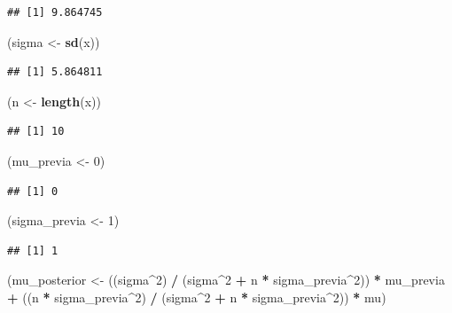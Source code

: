 \documentclass[
  12pt,
]{book}
\newenvironment{Shaded}{\begin{snugshade}}{\end{snugshade}}
\newcommand{\DecValTok}[1]{\textcolor[rgb]{0.00,0.00,0.81}{#1}}
\newcommand{\KeywordTok}[1]{\textcolor[rgb]{0.13,0.29,0.53}{\textbf{#1}}}
\newcommand{\NormalTok}[1]{#1}
\newcommand{\OperatorTok}[1]{\textcolor[rgb]{0.81,0.36,0.00}{\textbf{#1}}}
\newcommand{\StringTok}[1]{\textcolor[rgb]{0.31,0.60,0.02}{#1}}
\begin{document}
\begin{verbatim}
## [1] 9.864745
\end{verbatim}

\begin{Shaded}
\begin{Highlighting}[]
\NormalTok{(sigma \textless{}{-}}\StringTok{ }\KeywordTok{sd}\NormalTok{(x))}
\end{Highlighting}
\end{Shaded}

\begin{verbatim}
## [1] 5.864811
\end{verbatim}

\begin{Shaded}
\begin{Highlighting}[]
\NormalTok{(n \textless{}{-}}\StringTok{ }\KeywordTok{length}\NormalTok{(x))}
\end{Highlighting}
\end{Shaded}

\begin{verbatim}
## [1] 10
\end{verbatim}

\begin{Shaded}
\begin{Highlighting}[]
\NormalTok{(mu\_previa \textless{}{-}}\StringTok{ }\DecValTok{0}\NormalTok{)}
\end{Highlighting}
\end{Shaded}

\begin{verbatim}
## [1] 0
\end{verbatim}

\begin{Shaded}
\begin{Highlighting}[]
\NormalTok{(sigma\_previa \textless{}{-}}\StringTok{ }\DecValTok{1}\NormalTok{)}
\end{Highlighting}
\end{Shaded}

\begin{verbatim}
## [1] 1
\end{verbatim}

\begin{Shaded}
\begin{Highlighting}[]
\NormalTok{(mu\_posterior \textless{}{-}}\StringTok{ }\NormalTok{((sigma}\OperatorTok{\^{}}\DecValTok{2}\NormalTok{) }\OperatorTok{/}\StringTok{ }\NormalTok{(sigma}\OperatorTok{\^{}}\DecValTok{2} \OperatorTok{+}\StringTok{ }\NormalTok{n }\OperatorTok{*}\StringTok{ }\NormalTok{sigma\_previa}\OperatorTok{\^{}}\DecValTok{2}\NormalTok{)) }\OperatorTok{*}\StringTok{ }\NormalTok{mu\_previa }\OperatorTok{+}\StringTok{ }\NormalTok{((n }\OperatorTok{*}\StringTok{ }\NormalTok{sigma\_previa}\OperatorTok{\^{}}\DecValTok{2}\NormalTok{) }\OperatorTok{/}\StringTok{ }\NormalTok{(sigma}\OperatorTok{\^{}}\DecValTok{2} \OperatorTok{+}\StringTok{ }\NormalTok{n }\OperatorTok{*}\StringTok{ }\NormalTok{sigma\_previa}\OperatorTok{\^{}}\DecValTok{2}\NormalTok{)) }\OperatorTok{*}\StringTok{ }\NormalTok{mu)}
\end{Highlighting}
\end{Shaded}
\end{document}
